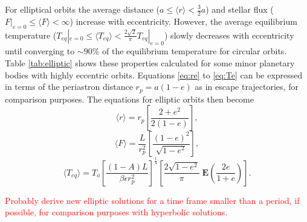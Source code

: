 \documentclass[a4paper,fleqn,usenatbib]{mnras}
\newcommand{\fix}{\textcolor{red}}
\begin{document}
For elliptical orbits the average distance ($a \leq \langle r \rangle < \frac{3}{2}a$) and stellar flux ($F|_{e=0} \leq \langle F \rangle < \infty$) increase with eccentricity. However, the average equilibrium temperature ($T_{eq}|_{e=0} \leq \langle T_{eq} \rangle < \frac{2\sqrt{2}}{\pi} T_{eq}|_{e=0}$) slowly decreases with eccentricity until converging to $\sim90\%$ of the equilibrium temperature for circular orbits. Table \ref{tab:elliptic} shows these properties calculated for some minor planetary bodies with highly eccentric orbits. Equations \ref{eq:re} to \ref{eq:Te} can be expressed in terms of the periastron distance $r_p=a(1-e)$ as in escape trajectories, for comparison purposes. The equations for elliptic orbits then become
\begin{equation} \label{eq:re2}
\langle r \rangle = r_p \left[ \frac{2+e^2}{2\left(1-e\right)} \right],
\end{equation}
\begin{equation} \label{eq:Fe2}
\langle F \rangle = \frac{L}{r_p^2} \left[\frac{\left(1-e\right)^2}{\sqrt{1-e^2}}\right],
\end{equation}
\begin{equation} \label{eq:Te2}
\langle T_{eq} \rangle = T_o\left[ \frac{(1-A)L}{\beta \epsilon r_p^2}\right] ^\frac{1}{4} \left[ \frac{2\sqrt{1-e^2}}{\pi} \; \mathbf{E}\left( \frac{2e}{1+e} \right) \right].
\end{equation}

\fix{Probably derive new elliptic solutions for a time frame smaller than a period, if possible, for comparison purposes with hyperbolic solutions.}
\end{document}
